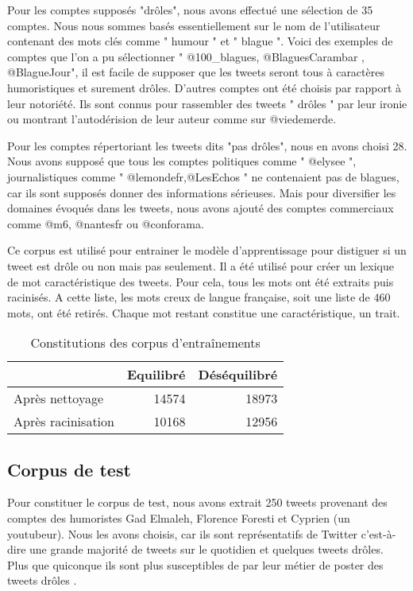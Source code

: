 \documentclass[10pt,a4paper,twoside]{article}
\begin{document}
Pour les comptes supposés "drôles", nous avons effectué une sélection de 35 comptes. Nous nous sommes basés essentiellement sur le nom de l'utilisateur contenant des mots clés comme " humour " et " blague ". Voici des exemples de comptes que l'on a pu sélectionner " @100\_blagues, @BlaguesCarambar , @BlagueJour", il est facile de supposer que les tweets seront tous à caractères humoristiques et surement drôles. D'autres comptes ont été choisis par rapport à leur notoriété. Ils sont connus pour rassembler des tweets " drôles " par leur ironie ou montrant l'autodérision de leur auteur comme sur @viedemerde.

Pour les comptes répertoriant les tweets dits "pas drôles", nous en avons choisi 28. Nous avons supposé que tous les comptes politiques comme " @elysee ", journalistiques comme " @lemondefr,@LesEchos " ne contenaient pas de blagues, car ils sont supposés donner des informations sérieuses. Mais pour diversifier les domaines évoqués dans les tweets, nous avons ajouté des comptes commerciaux comme @m6, @nantesfr ou @conforama.

Ce corpus est utilisé pour entrainer le modèle d'apprentissage pour distiguer si un tweet est drôle ou non mais pas seulement. Il a été utilisé pour créer un lexique de mot caractéristique des tweets. Pour cela, tous les mots ont été extraits puis racinisés. A cette liste, les mots creux de langue française, soit une liste de 460 mots, ont été retirés. Chaque mot restant constitue une caractéristique, un trait.



\begin{table}[!h]
\centering
	\begin{tabular}{lrr}
	\toprule
	& Equilibré & Déséquilibré \\
	\midrule
	 Après nettoyage & 14574 & 18973 \\
	 Après racinisation & 10168 & 12956 \\
	\bottomrule
	\end{tabular}
\caption{Constitutions des corpus d'entraînements}
\end{table}

\subsection{Corpus de test} 
Pour constituer le corpus de test, nous avons extrait 250 tweets provenant des comptes des humoristes Gad Elmaleh, Florence Foresti et Cyprien (un youtubeur). Nous les avons choisis, car ils sont représentatifs de Twitter c'est-à-dire une grande majorité de tweets sur le quotidien et quelques tweets drôles. Plus que quiconque ils sont plus susceptibles de par leur métier de poster des tweets drôles .
\end{document}
